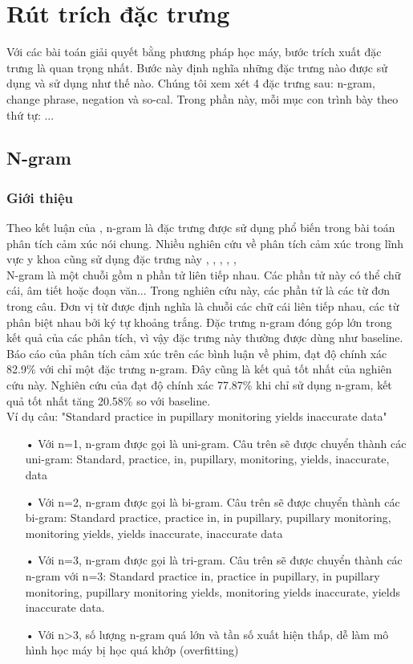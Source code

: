 \section{Rút trích đặc trưng}
Với các bài toán giải quyết bằng phương pháp học máy, bước trích xuất đặc trưng là quan trọng nhất. Bước này định nghĩa những đặc trưng nào được sử dụng và sử dụng như thế nào. Chúng tôi xem xét 4 đặc trưng sau: n-gram, change phrase, negation và so-cal. Trong phần này, mỗi mục con trình bày theo thứ tự: ...
\subsection{N-gram} \label{subsec:ngram}
\subsubsection*{Giới thiệu}
Theo kết luận của \cite{chandrakala2012opinion}, n-gram là đặc trưng được sử dụng phổ biến trong bài toán phân tích cảm xúc nói chung. Nhiều nghiên cứu về phân tích cảm xúc trong lĩnh vực y khoa cũng sử dụng đặc trưng này \cite{pang2002thumbs}, \cite{niu2005analysis}, \cite{sarker2011outcome}, \cite{niu2006using}, \cite{pestian2012sentie}, \cite{xia09improving} \\

N-gram là một chuỗi gồm n phần tử liên tiếp nhau. Các phần tử này có thể chữ cái, âm tiết hoặc đoạn văn... Trong nghiên cứu này, các phần tử là các từ đơn trong câu. Đơn vị từ được định nghĩa là chuỗi các chữ cái liên tiếp nhau, các từ phân biệt nhau bởi ký tự khoảng trắng. Đặc trưng n-gram đóng góp lớn trong kết quả của các phân tích, vì vậy đặc trưng này thường được dùng như baseline. Báo cáo  của \cite{pang2002thumbs} phân tích cảm xúc trên các bình luận về phim, đạt độ chính xác 82.9\% với chỉ một đặc trưng n-gram. Đây cũng là kết quả tốt nhất của nghiên cứu này. Nghiên cứu của \cite{niu2005analysis} đạt độ chính xác 77.87\% khi chỉ sử dụng n-gram, kết quả tốt nhất tăng 20.58\% so với baseline. \\

Ví dụ câu: "Standard practice in pupillary monitoring yields inaccurate data"
\begin{itemize}
\item[•]Với n=1, n-gram được gọi là uni-gram. Câu trên sẽ được chuyển thành các uni-gram: Standard, practice, in, pupillary, monitoring, yields, inaccurate, data
\item[•]Với n=2, n-gram được gọi là bi-gram. Câu trên sẽ được chuyển thành các bi-gram: Standard practice, practice in, in pupillary, pupillary monitoring, monitoring yields, yields inaccurate, inaccurate data
\item[•]Với n=3, n-gram được gọi là tri-gram. Câu trên sẽ được chuyển thành các n-gram với n=3: Standard practice in, practice in pupillary, in pupillary monitoring, pupillary monitoring yields, monitoring yields inaccurate, yields inaccurate data.
\item[•]Với n>3, số lượng n-gram quá lớn và tần số xuất hiện thấp, dễ làm mô hình học máy bị học quá khớp (overfitting)
\end{itemize}

